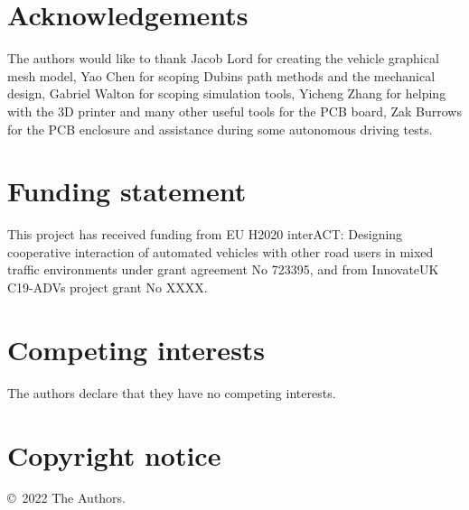 \documentclass[a4paper]{article}
\begin{document}
\section*{Acknowledgements}\label{h.gu3yyarx72d6}

	The authors would like to thank Jacob Lord for creating the vehicle graphical mesh model, Yao Chen for scoping Dubins path methods and the mechanical design, Gabriel Walton for scoping simulation tools, Yicheng Zhang for helping with the 3D printer and many other useful tools for the PCB board, Zak Burrows for the PCB enclosure and assistance during some autonomous driving tests.


\section*{Funding statement}\label{h.4u1a7tugh2om}


	This project has received funding from EU H2020 interACT: Designing cooperative interaction of automated vehicles with other road users in mixed traffic environments under grant agreement No 723395, and from InnovateUK C19-ADVs project grant No XXXX.


\section*{Competing interests}\label{h.q1j1rznb43fl}

	The authors declare that they have no competing interests.




	
	


\section*{Copyright notice}\label{h.jm5gcqv4g8x0}

\copyright~2022 The Authors. %
\end{document}
